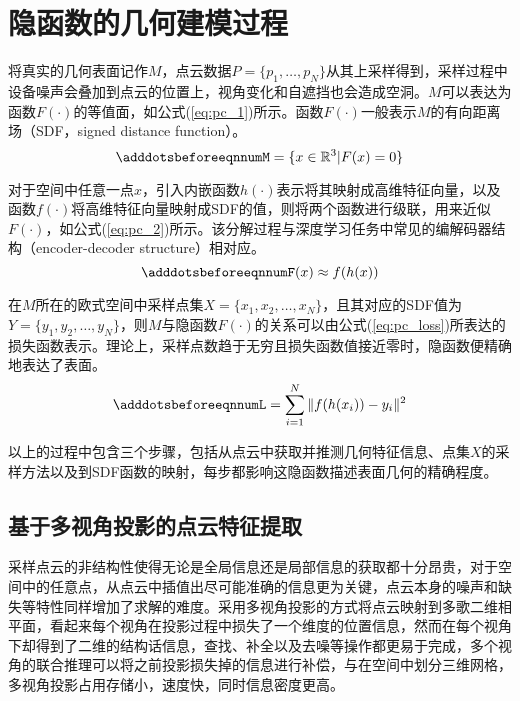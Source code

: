 \section{隐函数的几何建模过程}
将真实的几何表面记作$M$，点云数据$P=\{p_1, \dots, p_N\}$从其上采样得到，采样过程中设备噪声会叠加到点云的位置上，视角变化和自遮挡也会造成空洞。$M$可以表达为函数$F(\cdot)$的等值面，如公式(\ref{eq:pc_1})所示。函数$F(\cdot)$一般表示$M$的有向距离场（SDF，signed distance function）。
\begin{equation} \label{eq:pc_1}
    \adddotsbeforeeqnnum%
    M = \{x \in \mathbb{R}^3 | F(x) = 0\}
\end{equation}

对于空间中任意一点$x$，引入内嵌函数$h(\cdot)$表示将其映射成高维特征向量，以及函数$f(\cdot)$将高维特征向量映射成SDF的值，则将两个函数进行级联，用来近似$F(\cdot)$，如公式(\ref{eq:pc_2})所示。该分解过程与深度学习任务中常见的编解码器结构（encoder-decoder structure）相对应。
\begin{equation} \label{eq:pc_2}
    \adddotsbeforeeqnnum%
    F(x) \approx f(h(x))
\end{equation}

在$M$所在的欧式空间中采样点集$X = \{x_1, x_2, \dots, x_N\}$，且其对应的SDF值为$Y=\{y_1, y_2, \dots, y_N\}$，则$M$与隐函数$F(\cdot)$的关系可以由公式(\ref{eq:pc_loss})所表达的损失函数表示。理论上，采样点数趋于无穷且损失函数值接近零时，隐函数便精确地表达了表面。
\begin{equation} \label{eq:pc_loss}
    \adddotsbeforeeqnnum%
    L = \sum_{i=1}^N \|f(h(x_i)) - y_i\|^2
\end{equation}

以上的过程中包含三个步骤，包括从点云中获取并推测几何特征信息、点集$X$的采样方法以及到SDF函数的映射，每步都影响这隐函数描述表面几何的精确程度。

\subsection{基于多视角投影的点云特征提取}
采样点云的非结构性使得无论是全局信息还是局部信息的获取都十分昂贵，对于空间中的任意点，从点云中插值出尽可能准确的信息更为关键，点云本身的噪声和缺失等特性同样增加了求解的难度。采用多视角投影的方式将点云映射到多歌二维相平面，看起来每个视角在投影过程中损失了一个维度的位置信息，然而在每个视角下却得到了二维的结构话信息，查找、补全以及去噪等操作都更易于完成，多个视角的联合推理可以将之前投影损失掉的信息进行补偿，与在空间中划分三维网格，多视角投影占用存储小，速度快，同时信息密度更高。

